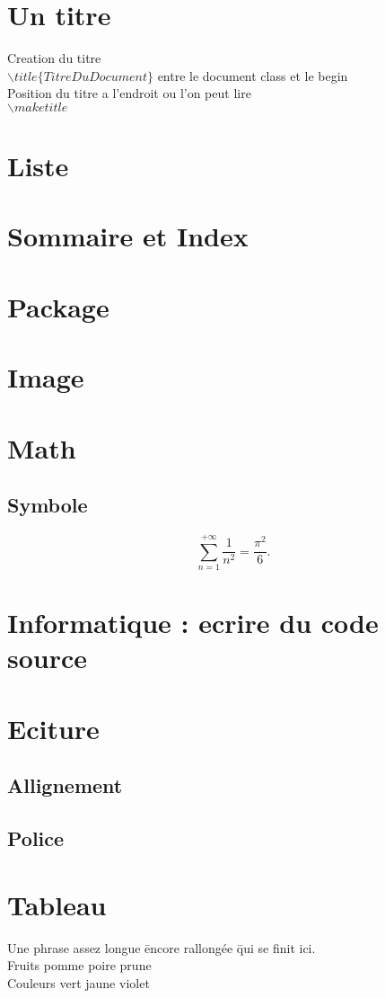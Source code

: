 \documentclass{article}
\begin{document}
	\section*{Un titre}
		Creation du titre \\
		$\backslash title\{Titre Du Document\}$
		entre le document class et le begin \\		
		Position du titre a l'endroit ou l'on peut lire \\
		$\backslash maketitle$ \\
	\section*{Liste}	
	\section*{Sommaire et Index}	
	\section*{Package}	
	\section*{Image}	
	\section*{Math}	
	\subsection*{Symbole}	
		\[\sum_{n=1}^{+\infty}\frac{1}{n^2}=\frac{\pi^2}{6}.\]
	\section*{Informatique : ecrire du code source}	
	\section*{Eciture}	
	\subsection*{Allignement}	
	\subsection*{Police}
	\section*{Tableau}	
		\begin{tabbing}
		Une phrase assez longue \= encore rallongée \= qui se finit ici. \= \\
		Fruits  \> pomme \> poire \> prune \\
		Couleurs \> vert \>jaune \> violet
		\end{tabbing}
\end{document}
